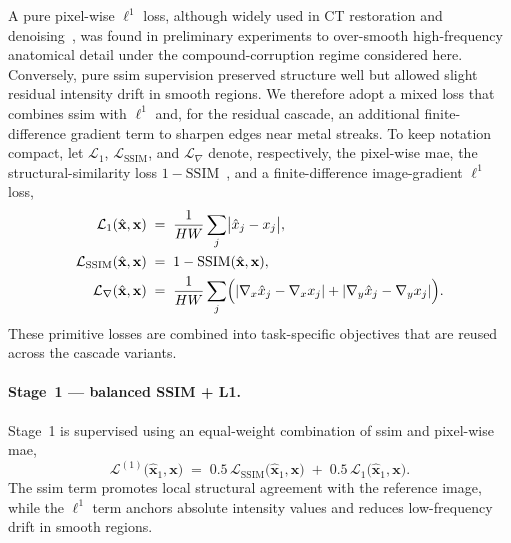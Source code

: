 A pure pixel-wise $\ell^{1}$ loss, although widely used in CT restoration and denoising~\cite{Chen2017, Zhang2017}, was found in preliminary experiments to over-smooth high-frequency anatomical detail under the compound-corruption regime considered here. Conversely, pure \gls{ssim} supervision preserved structure well but allowed slight residual intensity drift in smooth regions. We therefore adopt a mixed loss that combines \gls{ssim} with $\ell^{1}$ and, for the residual cascade, an additional finite-difference gradient term to sharpen edges near metal streaks. To keep notation compact, let $\mathcal{L}_{1}$, $\mathcal{L}_{\mathrm{SSIM}}$, and $\mathcal{L}_{\nabla}$ denote, respectively, the pixel-wise \gls{mae}, the structural-similarity loss \(1-\mathrm{SSIM}\)~\cite{Wang2004}, and a finite-difference image-gradient $\ell^{1}$ loss,
\begin{align}
    \mathcal{L}_{1}(\hat{\mathbf{x}}, \mathbf{x}) &\;=\; \frac{1}{HW}\sum_{j}\bigl|\hat{x}_{j} - x_{j}\bigr|,
    \label{eq:meth_l1_loss}\\
    \mathcal{L}_{\mathrm{SSIM}}(\hat{\mathbf{x}}, \mathbf{x}) &\;=\; 1 - \mathrm{SSIM}(\hat{\mathbf{x}}, \mathbf{x}),
    \label{eq:meth_ssim_loss}\\
    \mathcal{L}_{\nabla}(\hat{\mathbf{x}}, \mathbf{x})
        &\;=\; \frac{1}{HW}\sum_{j}\Bigl(
        |\nabla_{x}\hat{x}_{j}-\nabla_{x}x_{j}|
        + |\nabla_{y}\hat{x}_{j}-\nabla_{y}x_{j}|
        \Bigr).
    \label{eq:meth_grad_loss}
\end{align}
These primitive losses are combined into task-specific objectives that are reused across the cascade variants.

\paragraph{Stage~1 --- balanced SSIM + L1.}
Stage~1 is supervised using an equal-weight combination of \gls{ssim} and pixel-wise \gls{mae},
\begin{equation}
    \mathcal{L}^{(1)}\!\bigl(\hat{\mathbf{x}}_{1}, \mathbf{x}\bigr)
    \;=\; 0.5\,\mathcal{L}_{\mathrm{SSIM}}\!\bigl(\hat{\mathbf{x}}_{1}, \mathbf{x}\bigr)
    \;+\; 0.5\,\mathcal{L}_{1}\!\bigl(\hat{\mathbf{x}}_{1}, \mathbf{x}\bigr).
    \label{eq:meth_loss_stage1}
\end{equation}
The \gls{ssim} term promotes local structural agreement with the reference image, while the $\ell^{1}$ term anchors absolute intensity values and reduces low-frequency drift in smooth regions.

